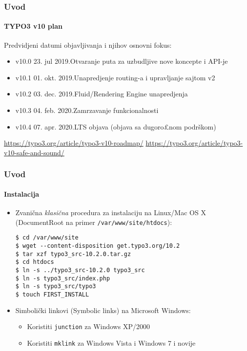 
\begin{frame}[fragile]
	\frametitle{Uvod}
	\framesubtitle{TYPO3 v10 plan}

	Predvidjeni datumi objavljivanja i njihov osnovni fokus:

	\begin{itemize}

		\item v10.0 \tabto{1.1cm}23. jul 2019.\tabto{3.4cm}Otvaranje puta za uzbudljive nove koncepte i API-je
		\item v10.1 \tabto{1.1cm}01. okt. 2019.\tabto{3.4cm}Unapredjenje routing-a i upravljanje sajtom v2
		\item
			\begingroup
				\color{typo3orange}
				v10.2 \tabto{1.1cm}03. dec. 2019.\tabto{3.4cm}Fluid/Rendering Engine unapredjenja
			\endgroup
		\item v10.3 \tabto{1.1cm}04. feb. 2020.\tabto{3.4cm}Zamrzavanje funkcionalnosti
		\item v10.4 \tabto{1.1cm}07. apr. 2020.\tabto{3.4cm}LTS objava (objava sa dugoro£nom podrškom)

	\end{itemize}

	\smaller
		\url{https://typo3.org/article/typo3-v10-roadmap/}\newline
		\url{https://typo3.org/article/typo3-v10-safe-and-sound/}
	\normalsize

\end{frame}


\begin{frame}[fragile]
	\frametitle{Uvod}
	\framesubtitle{Instalacija}

	\begin{itemize}
		\item Zvanična \textit{klasična} procedura za instalaciju na Linux/Mac OS X
			(DocumentRoot na primer \texttt{/var/www/site/htdocs}):
\begin{lstlisting}
$ cd /var/www/site
$ wget --content-disposition get.typo3.org/10.2
$ tar xzf typo3_src-10.2.0.tar.gz
$ cd htdocs
$ ln -s ../typo3_src-10.2.0 typo3_src
$ ln -s typo3_src/index.php
$ ln -s typo3_src/typo3
$ touch FIRST_INSTALL
\end{lstlisting}

		\item Simbolički linkovi (Symbolic links) na Microsoft Windows:

			\begin{itemize}
				\item Koristiti \texttt{junction} za Windows XP/2000
				\item Koristiti \texttt{mklink} za Windows Vista i Windows 7 i novije
			\end{itemize}

	\end{itemize}
\end{frame}

